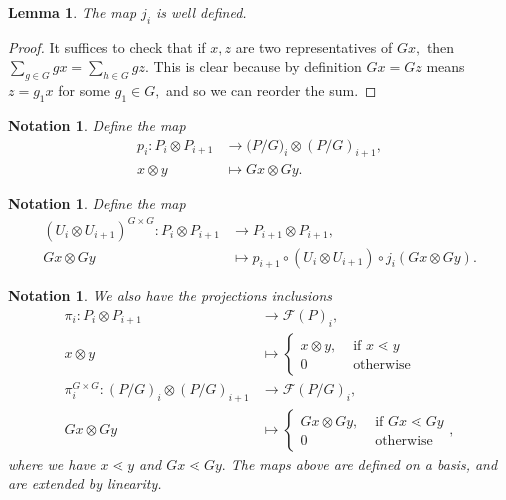 \documentclass{amsart}
\newtheorem{lem}[subsubsection]{Lemma}
\newtheorem{note}[subsubsection]{Notation}
\begin{document}
\begin{lem}
The map $j_i$ is well defined.
\end{lem}
\begin{proof}
It suffices to check that if $x,z$ are two representatives of $Gx,$ then $\sum_{g \in G}^{}gx = \sum_{h \in G}^{}gz.$ This is clear because by definition $Gx = Gz$ means $z = g_1x$ for some $g_1 \in G,$ and so we can reorder the sum.
\end{proof}

\begin{note}
Define the map
\begin{align*}
	p_i: P_i \otimes P_{i+1} &\rightarrow \mathcal (P/G)_i \otimes (P/G)_{i+1},\\
	x\otimes y &\mapsto Gx\otimes Gy.
\end{align*}
\end{note}

\begin{note}
Define the map 
\begin{align*}
	(U_i \otimes U_{i+1})^{G\times G}:P_i\otimes P_{i+1} &\rightarrow P_{i+1} \otimes P_{i+1},\\
	Gx \otimes Gy &\mapsto p_{i+1}\circ(U_i \otimes U_{i+1})\circ j_i(Gx\otimes Gy).
\end{align*}
\end{note}


\begin{note}
We also have the projections inclusions
\begin{align*}
	\pi_i:P_i \otimes P_{i+1} & \rightarrow \mathcal F(P)_{i},\\
	x\otimes y &\mapsto  \begin{cases}
	x\otimes y, &\text{ if }x\lessdot y\\
	0 &\text { otherwise}
\end{cases}\\
	\pi_i^{G\times G}: (P/G)_i \otimes (P/G)_{i+1} &\rightarrow\mathcal F(P/G)_i,\\
	Gx\otimes Gy &\mapsto \begin{cases}
	Gx\otimes Gy, &\text{ if }Gx\lessdot Gy\\
	0 &\text { otherwise}
\end{cases},
\end{align*}
where we have $x \lessdot y$ and $Gx \lessdot Gy.$ The maps above are defined on a basis, and are extended by linearity.
\end{note}
\end{document}
